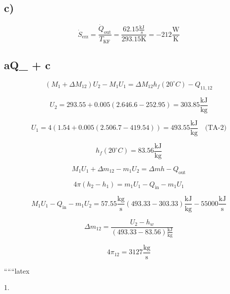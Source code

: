 

\subsection*{c)}

\[
\dot{S}_{\text{erz}} = \frac{\dot{Q}_{\text{out}}}{T_{\text{KF}}} = \frac{62.15 \frac{\text{kJ}}{\text{s}}}{293.15 \text{K}} = -212 \frac{\text{W}}{\text{K}}
\]

\subsection*{aQ_{} + c}

\[
(M_1 + \Delta M_{12}) U_2 - M_1 U_1 = \Delta M_{12} h_f (20^\circ C) - Q_{11,12}
\]

\[
U_2 = 293.55 + 0.005 (2.646.6 - 252.95) = 303.85 \frac{\text{kJ}}{\text{kg}}
\]

\[
U_1 = 4 (1.54 + 0.005 (2.506.7 - 419.54)) = 493.55 \frac{\text{kJ}}{\text{kg}} \quad \text{(TA-2)}
\]

\[
h_f (20^\circ C) = 83.56 \frac{\text{kJ}}{\text{kg}}
\]

\[
M_1 U_1 + \Delta m_{12} - m_1 U_2 = \Delta m h - Q_{\text{out}}
\]

\[
4 \pi (h_2 - h_1) = m_1 U_1 - Q_{\text{in}} - m_1 U_1
\]

\[
M_1 U_1 - Q_{\text{in}} - m_1 U_2 = 57.55 \frac{\text{kg}}{\text{s}} (493.33 - 303.33) \frac{\text{kJ}}{\text{kg}} - 55000 \frac{\text{kJ}}{\text{s}}
\]

\[
\Delta m_{12} = \frac{U_2 - h_w}{(493.33 - 83.56) \frac{\text{kJ}}{\text{kg}}}
\]

\[
4 \pi_{12} = 3127 \frac{\text{kg}}{\text{s}}
\]

``````latex


1.